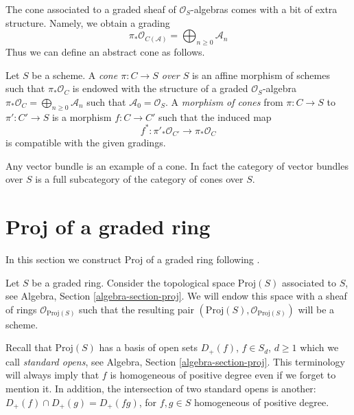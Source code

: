 \noindent
The cone associated to a graded sheaf of $\mathcal{O}_S$-algebras
comes with a bit of extra structure. Namely, we obtain a grading
$$
\pi_*\mathcal{O}_{C(\mathcal{A})} =
\bigoplus\nolimits_{n \geq 0} \mathcal{A}_n
$$
Thus we can define an abstract cone as follows.

\begin{definition}
\label{definition-abstract-cone}
Let $S$ be a scheme. A {\it cone $\pi : C \to S$ over $S$} is an
affine morphism of schemes such that $\pi_*\mathcal{O}_C$ is endowed with
the structure of a graded $\mathcal{O}_S$-algebra
$\pi_*\mathcal{O}_C = \bigoplus\nolimits_{n \geq 0} \mathcal{A}_n$
such that $\mathcal{A}_0 = \mathcal{O}_S$. A {\it morphism of cones}
from $\pi : C \to S$ to $\pi' : C' \to S$
is a morphism $f : C \to C'$ such that the induced map
$$
f^* : \pi'_*\mathcal{O}_{C'} \longrightarrow \pi_*\mathcal{O}_C
$$
is compatible with the given gradings.
\end{definition}

\noindent
Any vector bundle is an example of a cone. In fact the category of
vector bundles over $S$ is a full subcategory of the category of cones
over $S$.










\section{Proj of a graded ring}
\label{section-proj}

\noindent
In this section we construct Proj of a graded ring
following \cite[II, Section 2]{EGA}.

\medskip\noindent
Let $S$ be a graded ring. Consider the topological space $\text{Proj}(S)$
associated to $S$, see Algebra, Section \ref{algebra-section-proj}.
We will endow this space with a sheaf of rings $\mathcal{O}_{\text{Proj}(S)}$
such that the resulting pair $(\text{Proj}(S), \mathcal{O}_{\text{Proj}(S)})$
will be a scheme.

\medskip\noindent
Recall that $\text{Proj}(S)$ has a basis of open sets $D_{+}(f)$,
$f \in S_d$, $d \geq 1$ which we call {\it standard opens}, see Algebra,
Section \ref{algebra-section-proj}. This terminology will always
imply that $f$ is homogeneous of positive degree even if we forget to
mention it. In addition, the intersection of two standard opens is another:
$D_{+}(f) \cap D_{+}(g) = D_{+}(fg)$, for $f, g \in S$ homogeneous of positive
degree.

